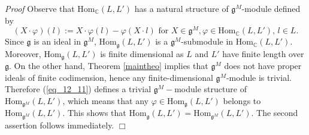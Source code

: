 \documentclass{svmult}
\renewenvironment{proof}{ \emph{Proof}}{$\Box$}
\renewcommand{\gg}{\mathfrak{g}}
\renewcommand {\phi} {\varphi}
\newcommand{\Hom}{\mathrm{Hom}}
\begin{document}
\begin{proof} Observe that $\Hom_{\mathbb C}(L,L')$ has a natural structure of $\gg^M$-module defined by
\begin{equation}\label{eq_12_11}
(X\cdot \varphi)(l):=X\cdot\varphi(l)-\varphi (X\cdot l)\,\,\text{for}\,\, X\in\gg^M, \varphi\in \Hom_{\mathbb C}(L,L'),\,l\in L. 
\end{equation}
Since $\gg$ is an ideal in $\gg^M$, $\Hom_{\gg}(L,L')$ is a $\gg^M$-submodule in $\Hom_{\mathbb C}(L,L')$. Moreover, $\Hom_{\gg}(L,L')$ is finite dimensional as $L$ and $L'$ have finite length over $\gg$. On the other hand, Theorem \ref{maintheo} implies that $\gg^M$ does not have proper ideals of finite codimension, hence any finite-dimensional $\gg^M$-module is trivial. Therefore (\ref{eq_12_11}) defines a trivial $\gg^M-$module structure of $\Hom_{\gg^M}(L,L')$, which means that any $\phi \in \Hom_\gg(L,L')$ belongs to $\Hom_{\gg^M}(L,L')$. This shows that $\Hom_{\gg}(L,L')=\Hom_{\gg^M}(L,L')$.
The second assertion follows immediately.
\end{proof}

\vspace{0.3cm}
\end{document}
